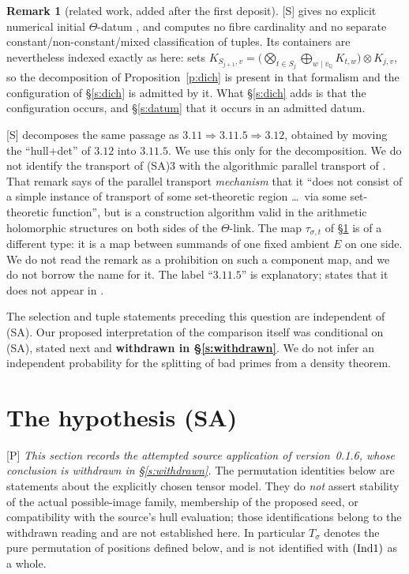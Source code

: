 \documentclass[11pt]{article}
\theoremstyle{plain}
\theoremstyle{definition}
\newtheorem{remark}{Remark}
\newcommand{\Ind}[1]{\textup{(Ind#1)}}
\newcommand{\SA}{\textup{(SA)}}
\begin{document}
\begin{remark}[related work, added after the first deposit]
\textup{[S]} \cite{LANA} gives no explicit numerical initial $\Theta$-datum
\cite[\S2]{LANA}, and computes no fibre cardinality and no separate
constant/non-constant/mixed classification of tuples.  Its containers are nevertheless indexed exactly as here:
\cite[\S5.2(a)]{LANA} sets
$K_{S_{j+1},v}=\bigl(\bigotimes_{t\in S_j}\bigoplus_{w\mid v_{\mathbb Q}}
K_{t,w}\bigr)\otimes K_{j,v}$, so the decomposition of
Proposition~\ref{p:dich} is present in that formalism and the configuration of
\S\ref{s:dich} is admitted by it.  What \S\ref{s:dich} adds is that the
configuration occurs, and \S\ref{s:datum} that it occurs in an admitted datum.

\textup{[S]} \cite{Form} decomposes the same passage as
$3.11\Rightarrow3.11.5\Rightarrow3.12$, obtained by moving the ``hull+det'' of
$3.12$ into $3.11.5$.  We use this only for the decomposition.  We do not identify
the transport of \SA3 with the algorithmic parallel transport of
\cite[Rem.~3.11.1(iv)]{IUT3}.  That remark says of the parallel transport
\emph{mechanism} that it ``does not consist of a simple instance of transport of
some set-theoretic region \dots\ via some set-theoretic function'', but is a
construction algorithm valid in the arithmetic holomorphic structures on both
sides of the $\Theta$-link.  The map $\tau_{\sigma,t}$ of \S\ref{s:sa} is of a
different type: it is a map between summands of one fixed ambient $E$ on one side.
We do not read the remark as a prohibition on such a component map, and we do not
borrow the name for it.  The label ``$3.11.5$'' is explanatory; \cite{Form} states
that it does not appear in \cite{IUT1,IUT2,IUT3,IUT4}.
\end{remark}

The selection and tuple statements preceding this question are independent of
\SA{}.  Our proposed interpretation of the comparison itself was conditional
on \SA{}, stated next and \textbf{withdrawn in \S\ref{s:withdrawn}}.  We do not infer an independent probability for
the splitting of bad primes from a density theorem.

\section{The hypothesis \texorpdfstring{\SA}{(SA)}}\label{s:sa}

\textup{[P]} \emph{This section records the attempted source application of
version~0.1.6, whose conclusion is withdrawn in \S\ref{s:withdrawn}.}  The
permutation identities below are statements about the explicitly chosen tensor
model.  They do \emph{not} assert stability of the actual possible-image family,
membership of the proposed seed, or compatibility with the source's hull
evaluation; those identifications belong to the withdrawn reading and are not
established here.  In particular $T_\sigma$ denotes the pure permutation of
positions defined below, and is not identified with $\Ind1$ as a whole.
\end{document}
